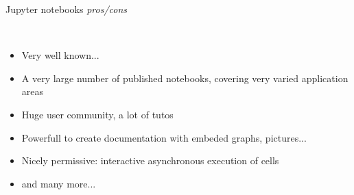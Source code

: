 \documentclass[11pt, serif, mathserif, compress]{beamer}  %
\begin{document}
\begin{frame}{Jupyter notebooks {\em pros/cons}}
  
  \begin {bclogo}[noborder=true, couleur=gray!20, couleurBarre=Chocolate, logo=\raisebox{1mm}{\,\huge😀}, marge=0, margeG=-0.5, margeD=-0.5,]
    {\ }
    \smallskip
    \begin{itemize}\setlength\itemsep{3mm}
    \item<2-> Very well known...
      
    \item<3-> A very large number of published notebooks, covering very varied application areas

    \item<4-> Huge user community, a lot of tutos

    \item<5-> Powerfull to create documentation with embeded graphs, pictures...

    \item<6-> Nicely permissive: interactive asynchronous execution of cells 

    \item<7-> and many more... 

    \end{itemize}
  \end{bclogo}
        
\end{frame}
\end{document}
